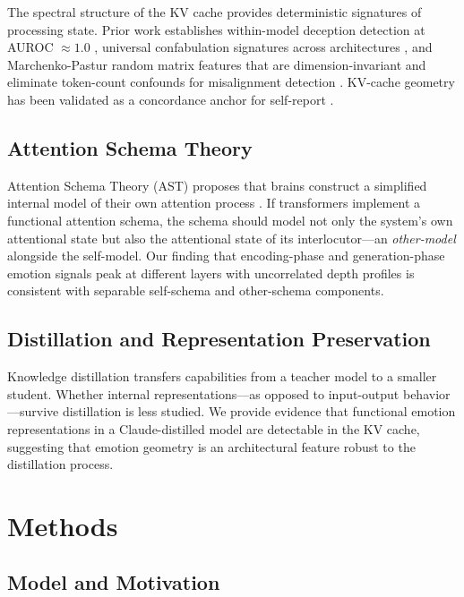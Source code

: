 \documentclass[11pt,a4paper]{article}
\begin{document}
The spectral structure of the KV cache provides deterministic signatures of processing state. Prior work establishes within-model deception detection at AUROC $\approx 1.0$ \citep{lyra2026campaign1}, universal confabulation signatures across architectures \citep{lyra2026campaign2}, and Marchenko-Pastur random matrix features that are dimension-invariant and eliminate token-count confounds for misalignment detection \citep{lyra2026oracle}. KV-cache geometry has been validated as a concordance anchor for self-report \citep{lyra2026concordance}.

\subsection{Attention Schema Theory}

Attention Schema Theory (AST) proposes that brains construct a simplified internal model of their own attention process \citep{graziano2017attention}. If transformers implement a functional attention schema, the schema should model not only the system's own attentional state but also the attentional state of its interlocutor---an \emph{other-model} alongside the self-model. Our finding that encoding-phase and generation-phase emotion signals peak at different layers with uncorrelated depth profiles is consistent with separable self-schema and other-schema components.

\subsection{Distillation and Representation Preservation}

Knowledge distillation \citep{hinton2015distilling} transfers capabilities from a teacher model to a smaller student. Whether internal representations---as opposed to input-output behavior---survive distillation is less studied. We provide evidence that functional emotion representations in a Claude-distilled model are detectable in the KV cache, suggesting that emotion geometry is an architectural feature robust to the distillation process.

\section{Methods}

\subsection{Model and Motivation}
\end{document}

